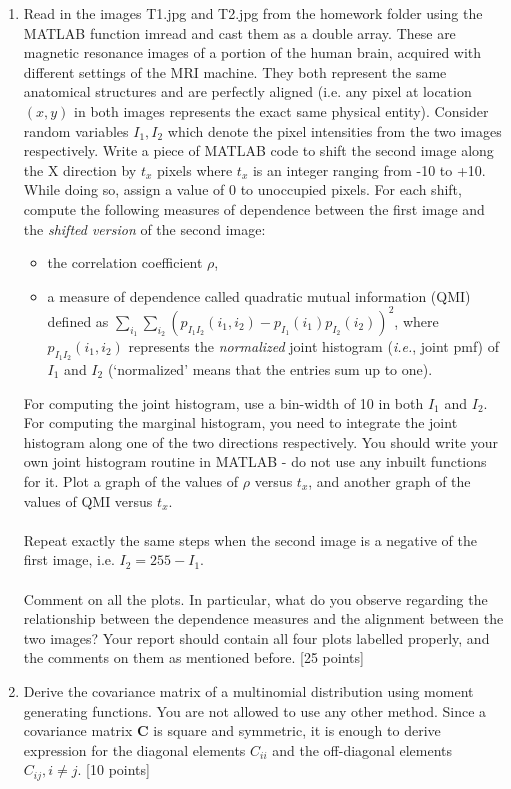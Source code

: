 \documentclass[11pt]{article}
\begin{document}
\begin{enumerate}
\item Read in the images T1.jpg and T2.jpg from the homework folder using the MATLAB function imread and cast them as a double array. These are magnetic resonance images of a portion of the human brain, acquired with different settings of the MRI machine. They both represent the same anatomical structures and are perfectly aligned (i.e. any pixel at location $(x,y)$ in both images represents the exact same physical entity). Consider random variables $I_1, I_2$ which denote the pixel intensities from the two images respectively. Write a piece of MATLAB code to shift the second image along the X direction by $t_x$ pixels where $t_x$ is an integer ranging from -10 to +10. While doing so, assign a value of 0 to unoccupied pixels. For each shift, compute the following measures of dependence between the first image and the \emph{shifted version} of the second image:
\begin{itemize}
\item the correlation coefficient $\rho$, 
\item a measure of dependence called quadratic mutual information (QMI) defined as $\sum_{i_1}\sum_{i_2} (p_{I_1 I_2}(i_1,i_2)-p_{I_1}(i_1)p_{I_2}(i_2))^2$, where $p_{I_1 I_2}(i_1,i_2)$ represents the \emph{normalized} joint histogram (\textit{i.e.}, joint pmf) of $I_1$ and $I_2$ (`normalized' means that the entries sum up to one). 
\end{itemize}
For computing the joint histogram, use a bin-width of 10 in both $I_1$ and $I_2$. For computing the marginal histogram, you need to integrate the joint histogram along one of the two directions respectively. You should write your own joint histogram routine in MATLAB - do not use any inbuilt functions for it. Plot a graph of the values of $\rho$ versus $t_x$, and another graph of the values of QMI versus $t_x$.\\\\ Repeat exactly the same steps when the second image is a negative of the first image, i.e. $I_2 = 255 - I_1$. \\\\
Comment on all the plots. In particular, what do you observe regarding the relationship between the dependence measures and the alignment between the two images? Your report should contain all four plots labelled properly, and the comments on them as mentioned before. \textsf{[25 points]}

\item Derive the covariance matrix of a multinomial distribution using moment generating functions. You are not allowed to use any other method. Since a covariance matrix $\boldsymbol{C}$ is square and symmetric, it is enough to derive expression for the diagonal elements $C_{ii}$ and the off-diagonal elements $C_{ij}, i \neq j$. \textsf{[10 points]}

\end{enumerate}
\end{document}
